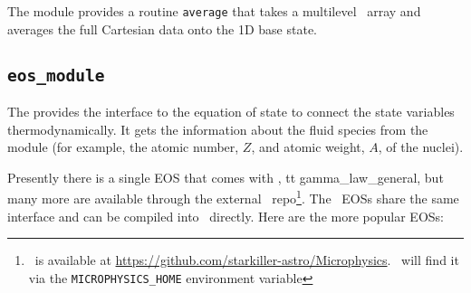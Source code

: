 The  module provides a routine {\tt average} that takes
a multilevel \multifab\ array and averages the full Cartesian data
onto the 1D base state.

\subsection{{\tt eos\_module}}

The  provides the interface to the equation of 
state to connect the state variables thermodynamically.  It 
gets the information about the fluid species from the 
module (for example, the atomic number, $Z$, and atomic weight, $A$,
of the nuclei).

Presently there is a single EOS that comes with \maestro, {tt gamma\_law\_general},
but many more are available through the external \microphysics\ repo\footnote{\microphysics\ is
available at \url{https://github.com/starkiller-astro/Microphysics}.  \maestro\ will
find it via the {\tt MICROPHYSICS\_HOME} environment variable}.  The \microphysics\
EOSs share the same interface and can be compiled into \maestro\ directly.  
Here are the more popular EOSs:
